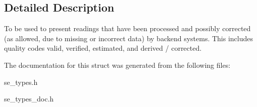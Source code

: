 \subsection{Detailed Description}
To be used to present readings that have been processed and possibly corrected (as allowed, due to missing or incorrect data) by backend systems. This includes quality codes valid, verified, estimated, and derived / corrected. 

The documentation for this struct was generated from the following files\+:\begin{DoxyCompactItemize}
\item 
se\+\_\+types.\+h\item 
se\+\_\+types\+\_\+doc.\+h\end{DoxyCompactItemize}
